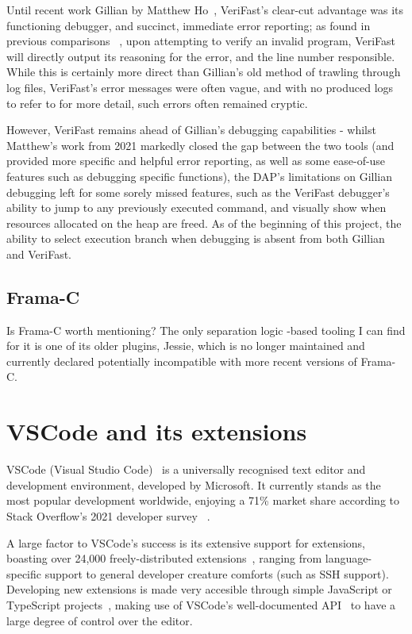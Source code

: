 Until recent work Gillian by Matthew Ho~\cite{gillian-debugging-2021},
VeriFast's clear-cut advantage was its functioning debugger, and succinct,
immediate error reporting; as found in previous comparisons
~\cite{gillian-logging-2020}, upon attempting to verify an invalid program,
VeriFast will directly output its reasoning for the error, and the line number
responsible. While this is certainly more direct than Gillian's old method of
trawling through log files, VeriFast's error messages were often vague, and
with no produced logs to refer to for more detail, such errors often remained
cryptic.

However, VeriFast remains ahead of Gillian's debugging capabilities - whilst
Matthew's work from 2021 markedly closed the gap between the two tools (and
provided more specific and helpful error reporting, as well as some ease-of-use
features such as debugging specific functions), the DAP's limitations on
Gillian debugging left for some sorely missed features, such as the VeriFast
debugger's ability to jump to any previously executed command, and visually
show when resources allocated on the heap are freed. As of the beginning of
this project, the ability to select execution branch when debugging is absent
from both Gillian and VeriFast.

\subsection{Frama-C}

Is Frama-C worth mentioning? The only separation logic -based tooling I can
find for it is one of its older plugins, Jessie, which is no longer maintained
and currently declared potentially incompatible with more recent versions of
Frama-C.


\section{VSCode and its extensions}

VSCode (Visual Studio Code)~\cite{vscode} is a universally recognised text
editor and development environment, developed by Microsoft. It currently stands
as the most popular development worldwide, enjoying a 71\% market share
according to Stack Overflow's 2021 developer survey
~\cite{stack-overflow-survey-editors}.

A large factor to VSCode's success is its extensive support for extensions,
boasting over 24,000 freely-distributed extensions~\cite{vscode-popularity},
ranging from language-specific support to general developer creature comforts
(such as SSH support). Developing new extensions is made very accesible through
simple JavaScript or TypeScript projects~\cite{vscode-extensions-intro}, making
use of VSCode's well-documented API~\cite{vscode-api} to have a large degree of
control over the editor.

